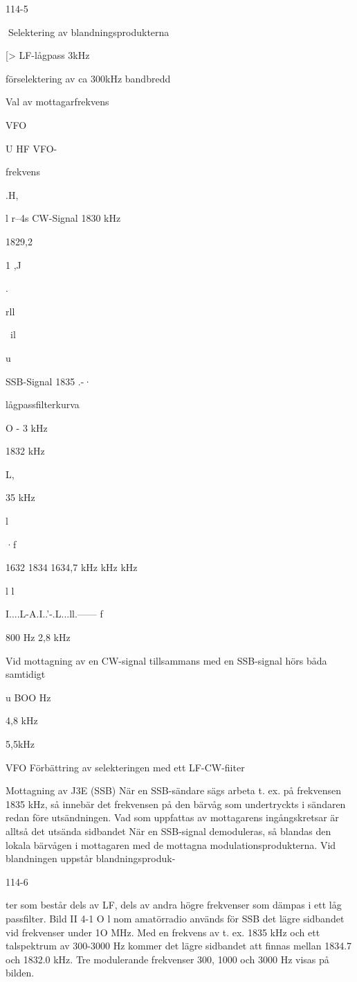 114-5

Selektering av blandningsprodukterna

[>
LF-lågpass
3kHz

förselektering
av ca 300kHz
bandbredd

Val av mottagarfrekvens

VFO

U HF
VFO-

frekvens

.H,

l r--4s
CW-Signal
1830 kHz

1829,2

1
,J

.

rll

~il

u

SSB-Signal
1835 .-·

lågpassfilterkurva

O - 3 kHz

1832 kHz

 L,

35 kHz

l

·f

1632 1834 1634,7
kHz kHz kHz

l
l

I....L-A.I..'-.L...ll.------ f

800 Hz 2,8 kHz

Vid mottagning av en CW-signal tillsammans med en SSB-signal hörs båda samtidigt

u
BOO Hz

4,8 kHz

5,5kHz

VFO
Förbättring av selekteringen med ett LF-CW-fiiter

Mottagning av J3E (SSB)
När en SSB-sändare sägs arbeta t. ex. på
frekvensen 1835 kHz, så innebär det frekvensen på den bärvåg som undertryckts i
sändaren redan före utsändningen.
Vad som uppfattas av mottagarens ingångskretsar är alltså det utsända sidbandet När en SSB-signal demoduleras, så
blandas den lokala bärvågen i mottagaren
med de mottagna modulationsprodukterna.
Vid blandningen uppstår blandningsproduk-

114-6

ter som består dels av LF, dels av andra
högre frekvenser som dämpas i ett låg passfilter.
Bild II 4-1 O
l nom amatörradio används för SSB det lägre sidbandet vid frekvenser under 1O MHz.
Med en frekvens av t. ex. 1835 kHz och ett
talspektrum av 300-3000 Hz kommer det
lägre sidbandet att finnas mellan 1834.7
och 1832.0 kHz. Tre modulerande frekvenser 300, 1000 och 3000 Hz visas på bilden.

